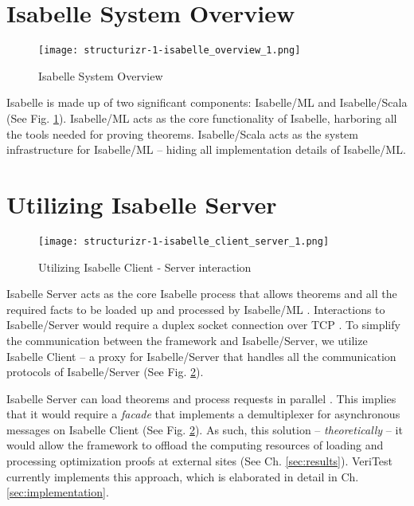 \section{Isabelle System Overview}
\label{sec:IsabelleSystemOverview}

\begin{figure}[!htb]
      \centering
      \texttt{[image: structurizr-1-isabelle\_overview\_1.png]}
      \caption{Isabelle System Overview}
      \label{fig:IsabelleSystem}
\end{figure}

Isabelle is made up of two significant components: Isabelle/ML and Isabelle/Scala \cite[Ch. 5]{isabelleSystem} (See Fig. \ref{fig:IsabelleSystem}). 
Isabelle/ML acts as the core functionality of Isabelle, harboring all the tools needed for proving theorems. Isabelle/Scala acts as the system 
infrastructure for Isabelle/ML -- hiding all implementation details of Isabelle/ML.

\section{Utilizing Isabelle Server}
\label{sec:IsabelleServer}

\begin{figure}[!htb]
      \centering
      \texttt{[image: structurizr-1-isabelle\_client\_server\_1.png]}
      \caption{Utilizing Isabelle Client - Server interaction}
      \label{fig:IsabelleServer}
\end{figure}

Isabelle Server acts as the core Isabelle process that allows theorems and all the required facts to be loaded up and processed by Isabelle/ML
\cite[Ch. 4]{isabelleSystem}. Interactions to Isabelle/Server would require a duplex socket connection over TCP \cite[Sec. 4.2]{isabelleSystem}. 
To simplify the communication between the framework and Isabelle/Server, we utilize Isabelle Client \cite[Sec. 4.1.2]{isabelleSystem} -- a proxy 
for Isabelle/Server that handles all the communication protocols of Isabelle/Server (See Fig. \ref{fig:IsabelleServer}).

Isabelle Server can load theorems and process requests in parallel \cite[Sec. 4.2.6]{isabelleSystem}. This implies that it would require a 
\emph{facade} that implements a demultiplexer for asynchronous messages on Isabelle Client (See Fig. \ref{fig:IsabelleServer}). As such, this 
solution -- \emph{theoretically} -- it would allow the framework to offload the computing resources of loading 
and processing optimization proofs at external sites (See Ch. \ref{sec:results}). VeriTest currently implements this approach, which is 
elaborated in detail in Ch. \ref{sec:implementation}.

